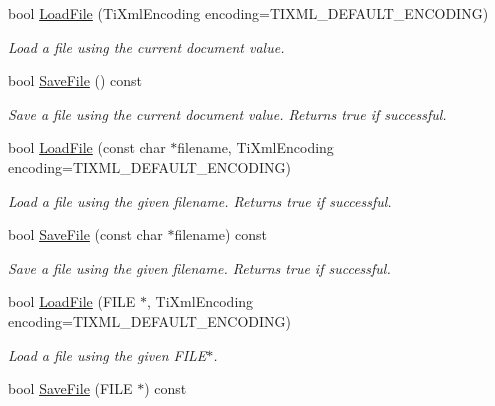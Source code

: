 \begin{DoxyCompactItemize}
\item 
bool \hyperlink{class_ti_xml_document_a4c852a889c02cf251117fd1d9fe1845f}{Load\+File} (Ti\+Xml\+Encoding encoding=T\+I\+X\+M\+L\+\_\+\+D\+E\+F\+A\+U\+L\+T\+\_\+\+E\+N\+C\+O\+D\+I\+NG)
\begin{DoxyCompactList}\small\item\em Load a file using the current document value. \end{DoxyCompactList}\item 
bool \hyperlink{class_ti_xml_document_a21c0aeb0d0a720169ad4ac89523ebe93}{Save\+File} () const \hypertarget{class_ti_xml_document_a21c0aeb0d0a720169ad4ac89523ebe93}{}\label{class_ti_xml_document_a21c0aeb0d0a720169ad4ac89523ebe93}

\begin{DoxyCompactList}\small\item\em Save a file using the current document value. Returns true if successful. \end{DoxyCompactList}\item 
bool \hyperlink{class_ti_xml_document_a879cdf5e981b8b2d2ef82f2546dd28fb}{Load\+File} (const char $\ast$filename, Ti\+Xml\+Encoding encoding=T\+I\+X\+M\+L\+\_\+\+D\+E\+F\+A\+U\+L\+T\+\_\+\+E\+N\+C\+O\+D\+I\+NG)\hypertarget{class_ti_xml_document_a879cdf5e981b8b2d2ef82f2546dd28fb}{}\label{class_ti_xml_document_a879cdf5e981b8b2d2ef82f2546dd28fb}

\begin{DoxyCompactList}\small\item\em Load a file using the given filename. Returns true if successful. \end{DoxyCompactList}\item 
bool \hyperlink{class_ti_xml_document_ae869f5ebf7fc54c4a1d737fb4689fd44}{Save\+File} (const char $\ast$filename) const \hypertarget{class_ti_xml_document_ae869f5ebf7fc54c4a1d737fb4689fd44}{}\label{class_ti_xml_document_ae869f5ebf7fc54c4a1d737fb4689fd44}

\begin{DoxyCompactList}\small\item\em Save a file using the given filename. Returns true if successful. \end{DoxyCompactList}\item 
bool \hyperlink{class_ti_xml_document_a41f6fe7200864d1dca663d230caf8db6}{Load\+File} (F\+I\+LE $\ast$, Ti\+Xml\+Encoding encoding=T\+I\+X\+M\+L\+\_\+\+D\+E\+F\+A\+U\+L\+T\+\_\+\+E\+N\+C\+O\+D\+I\+NG)
\begin{DoxyCompactList}\small\item\em Load a file using the given F\+I\+L\+E$\ast$. \end{DoxyCompactList}\item 
bool \hyperlink{class_ti_xml_document_acf1672b4538c6d1d441f9f108aea2bf4}{Save\+File} (F\+I\+LE $\ast$) const \hypertarget{class_ti_xml_document_acf1672b4538c6d1d441f9f108aea2bf4}{}\label{class_ti_xml_document_acf1672b4538c6d1d441f9f108aea2bf4}


\end{DoxyCompactItemize}
